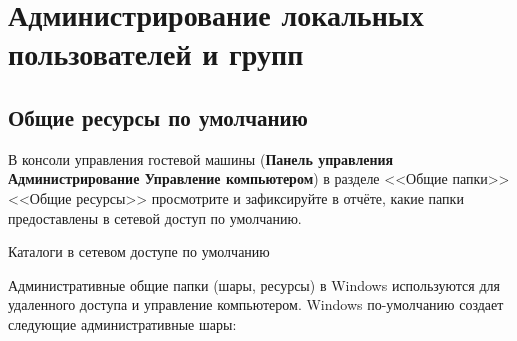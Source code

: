
\section{Администрирование локальных пользователей и групп}

\subsection{Общие ресурсы по умолчанию}

В консоли управления гостевой машины
(\textbf{Панель управления \rarrow Администрирование
\rarrow Управление компьютером})
в разделе <<Общие папки>> \rarrow <<Общие ресурсы>>
просмотрите и зафиксируйте в отчёте,
какие папки предоставлены в сетевой доступ по умолчанию.

\begin{image}
	\caption{Каталоги в сетевом доступе по умолчанию}
	\label{fig:net:share:dir}
\end{image}

Административные общие папки (шары, ресурсы) в Windows используются
для удаленного доступа и управление компьютером.
Windows по-умолчанию создает следующие административные шары:

